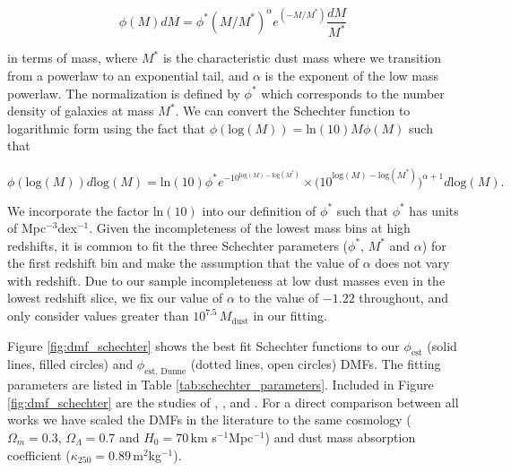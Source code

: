 \begin{equation}
    \phi(M) dM = \phi^* (M/M^*)^\alpha e^{(-M/M^*)}\frac{dM}{M^*}
    \label{eq:schechter_function}
\end{equation}

\noindent in terms of mass, where $M^*$ is the characteristic dust mass where we transition from a powerlaw to an exponential tail, and $\alpha$ is the exponent of the low mass powerlaw. The normalization is defined by $\phi^*$ which corresponds to the number density of galaxies at mass $M^*$. We can convert the Schechter function to logarithmic form using the fact that $\phi(\textrm{log}(M)) = \textrm{ln}(10)M\phi(M)$ such that

\begin{equation}
    \phi(\textrm{log}(M)) d\textrm{log}(M) = \textrm{ln}(10)\phi^* e^{-10^{\textrm{log}(M)-\textrm{log}(M^*)}}\times \Bigg(10^{\textrm{log}(M)-\textrm{log}(M^*)}\Bigg)^{\alpha+1} d\textrm{log}(M).
    \label{eq:schechter_function_log}
\end{equation}

We incorporate the factor $\textrm{ln}(10)$ into our definition of $\phi^*$ such that $\phi^*$ has units of Mpc$^{-3}$dex$^{-1}$. Given the incompleteness of the lowest mass bins at high redshifts, it is common to fit the three Schechter parameters ($\phi^*$, $M^*$ and $\alpha$) for the first redshift bin and make the assumption that the value of $\alpha$ does not vary with redshift. Due to our sample incompleteness at low dust masses even in the lowest redshift slice, we fix our value of $\alpha$ to the \citealt{Beeston_2018} value of $-1.22$ throughout, and only consider values greater than $10^{7.5}\,M_{\textrm{dust}}$ in our fitting.

Figure \ref{fig:dmf_schechter} shows the best fit Schechter functions to our $\phi_{\textrm{est}}$ (solid lines, filled circles) and $\phi_{\textrm{est, Dunne}}$ (dotted lines, open circles) DMFs. The fitting parameters are listed in Table \ref{tab:schechter_parameters}. Included in Figure \ref{fig:dmf_schechter} are the studies of \citealt{Vlahakis_2005}, \citealt{Dunne_2011}, \citealt{Beeston_2018} and \citealt{Pozzi_2020}. For a direct comparison between all works we have scaled the DMFs in the literature to the same cosmology ($\Omega_m = 0.3$, $\Omega_\Lambda = 0.7$ and $H_0 = 70\,$km s$^{-1}$Mpc$^{-1}$) and dust mass absorption coefficient ($\kappa_{250} = 0.89\,$m$^{2}$kg$^{-1}$).

